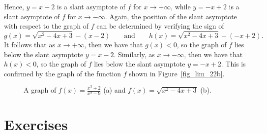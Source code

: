 \begin{example}
\begin{enumerate}
\begin{enumerate}
Hence,  $y=x-2$ is a slant asymptote of $f$ for $x \rightarrow + \infty$, while $y=-x+2$ is a slant asymptote of $f$  for $x \rightarrow -\infty$. Again, the position of the slant asymptote with respect to the graph of $f$ can be determined by verifying the sign of 
\[
g(x) = \sqrt{x^2-4x+3}  - (x-2) %
\qquad\mbox{and}\qquad%
h(x) = \sqrt{x^2-4x+3} - (-x+2) %
.\]
It follows that as $x \rightarrow +\infty$, then we have that  $g(x) < 0$, so the graph of $f$ lies below the slant asymptote $y=x-2$. Similarly, as  $x \rightarrow -\infty$, then we have that $h(x) < 0$, so the graph of $f$ lies below the slant asymptote $y=-x+2$. This is confirmed by the graph of the function $f$ shown in Figure~\ref{fig_lim_22b}.

\end{enumerate}

\end{enumerate}

\begin{figure}[H]
\centerline{
\qquad
{}
}
\caption{A graph of $f(x)=\frac{x^3+2}{x^2-9}$ (a) and $f(x)=\sqrt{x^2-4x+3}$ (b). }
\end{figure}
\end{example}

\fi



\ifcourse
\newpage
\section{Exercises}

